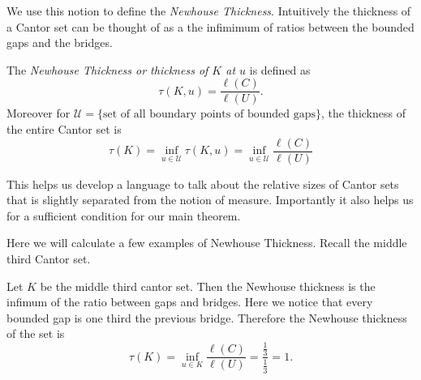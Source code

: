 We use this notion to define the \textit{Newhouse Thickness}.  Intuitively the thickness of a Cantor set can be thought of as a the infimimum of ratios between the bounded gaps and the bridges.  
\begin{definition}
    The \textit{Newhouse Thickness or thickness of $K$ at $u$} is defined as
    $$\tau(K, u) = \frac{\ell(C)}{\ell(U)}.$$
    Moreover for $\mathcal{U} = \{ \text{set of all boundary points of bounded gaps}\}$, the thickness of the entire Cantor set is 
    $$\tau(K) = \inf_{u\in \mathcal{U}} \tau(K, u) = \inf_{u\in \mathcal{U}}\frac{\ell(C)}{\ell(U)}$$
\end{definition}
This helps us develop a language to talk about the relative sizes of Cantor sets that is slightly separated from the notion of measure.  Importantly it also helps us for a sufficient condition for our main theorem.

Here we will calculate a few examples of Newhouse Thickness.  Recall the middle third Cantor set.  
\begin{example}
    Let $K$ be the middle third cantor set.  Then the Newhouse thickness is the infimum of the ratio between gaps and bridges.  Here we notice that every bounded gap is one third the previous bridge.  Therefore the Newhouse thickness of the set is 
    $$\tau(K) = \inf_{u\in K}\frac{\ell(C)}{\ell(U)} = \frac{\frac{1}{3}}{\frac{1}{3}} = 1.$$
\end{example}

